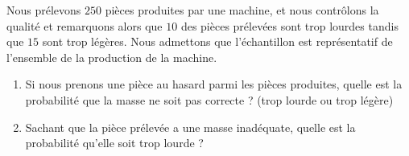
\begin{exercice}%
    \label{exosmath-0396}

    Nous prélevons \( 250\) pièces produites par une machine, et nous contrôlons la qualité et remarquons alors que \( 10\) des pièces prélevées sont trop lourdes tandis que \( 15\) sont trop légères. Nous admettons que l'échantillon est représentatif de l'ensemble de la production de la machine.

    \begin{enumerate}
        \item
            Si nous prenons une pièce au hasard parmi les pièces produites, quelle est la probabilité que la masse ne soit pas correcte ? (trop lourde ou trop légère)
        \item
            Sachant que la pièce prélevée a une masse inadéquate, quelle est la probabilité qu'elle soit trop lourde ?
    \end{enumerate}

\end{exercice}
